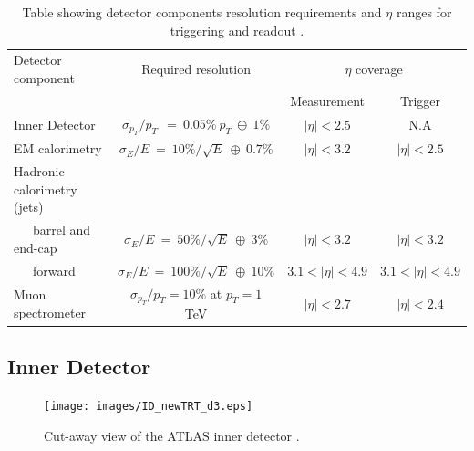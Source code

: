 	\begin {table}[h]
	\begin{center}
	\begin{tabular}{ | l | c | c | c | } 
		\hline
		Detector component & Required resolution & \multicolumn{2}{|c|}{$\eta$ coverage} \\
		 & & Measurement & Trigger \\
    	\hline\hline
    	Inner Detector & $\sigma_{p_{T}}/p_{T}~~=~0.05\%~p_{T}~\oplus~1\%$ & $|\eta|<2.5$ & N.A \\
    	\hline
    	EM calorimetry & $\sigma_{E}/E~=~10\%/\sqrt{E}~\oplus~0.7\%$ & $|\eta|<3.2$ & $|\eta|<2.5$ \\
    	\hline
    	Hadronic calorimetry (jets) &  &  &  \\
    	~~~barrel and end-cap & $\sigma_{E}/E~=~50\%/\sqrt{E}~\oplus~3\%$ & $|\eta|<3.2$ & $|\eta|<3.2$ \\
    	~~~forward  & $\sigma_{E}/E~=~100\%/\sqrt{E}~\oplus~10\%$ & $3.1<|\eta|<4.9$ & $3.1<|\eta|<4.9$ \\
    	\hline
    	Muon spectrometer & $\sigma_{p_{T}}/p_{T} =10\%$ at $p_{T} = 1$ TeV & $|\eta|<2.7$ & $|\eta|<2.4$ \\
    	\hline
  	\end{tabular}
  	\label{tab:det_res}
  	\caption{Table showing detector components resolution requirements and $\eta$ ranges for triggering and readout \cite{Aad:1129811}.}
  	\end{center}
	\end {table}




	\subsection{Inner Detector}

		\begin{figure}[h]
			\begin{center}
				\texttt{[image: images/ID\_newTRT\_d3.eps]}
			\end{center}
			\caption{Cut-away view of the ATLAS inner detector \cite{Aad:1129811}.}
			\label{fig:ATLAS_inner}
		\end{figure}

